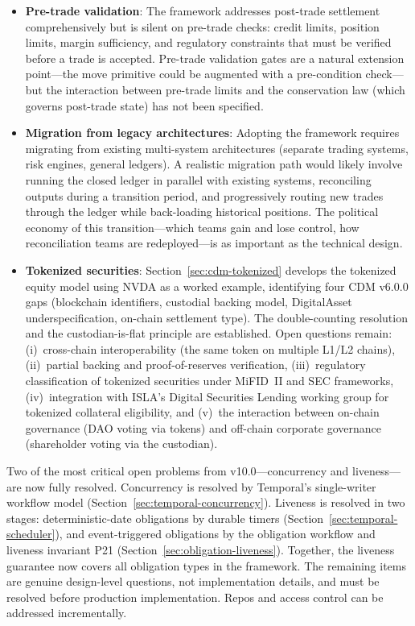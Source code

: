 \documentclass[11pt,a4paper]{article}
\begin{document}
\begin{itemize}
\item \textbf{Pre-trade validation}: The framework addresses post-trade settlement comprehensively but is silent on pre-trade checks: credit limits, position limits, margin sufficiency, and regulatory constraints that must be verified before a trade is accepted. Pre-trade validation gates are a natural extension point---the move primitive could be augmented with a pre-condition check---but the interaction between pre-trade limits and the conservation law (which governs post-trade state) has not been specified.

\item \textbf{Migration from legacy architectures}: Adopting the framework requires migrating from existing multi-system architectures (separate trading systems, risk engines, general ledgers). A realistic migration path would likely involve running the closed ledger in parallel with existing systems, reconciling outputs during a transition period, and progressively routing new trades through the ledger while back-loading historical positions. The political economy of this transition---which teams gain and lose control, how reconciliation teams are redeployed---is as important as the technical design.

\item \textbf{Tokenized securities}: Section~\ref{sec:cdm-tokenized} develops the tokenized equity model using NVDA as a worked example, identifying four CDM v6.0.0 gaps (blockchain identifiers, custodial backing model, DigitalAsset underspecification, on-chain settlement type). The double-counting resolution and the custodian-is-flat principle are established. Open questions remain: (i)~cross-chain interoperability (the same token on multiple L1/L2 chains), (ii)~partial backing and proof-of-reserves verification, (iii)~regulatory classification of tokenized securities under MiFID~II and SEC frameworks, (iv)~integration with ISLA's Digital Securities Lending working group for tokenized collateral eligibility, and (v)~the interaction between on-chain governance (DAO voting via tokens) and off-chain corporate governance (shareholder voting via the custodian).
\end{itemize}

\noindent Two of the most critical open problems from v10.0---concurrency and liveness---are now fully resolved. Concurrency is resolved by Temporal's single-writer workflow model (Section~\ref{sec:temporal-concurrency}). Liveness is resolved in two stages: deterministic-date obligations by durable timers (Section~\ref{sec:temporal-scheduler}), and event-triggered obligations by the obligation workflow and liveness invariant P21 (Section~\ref{sec:obligation-liveness}). Together, the liveness guarantee now covers all obligation types in the framework. The remaining items are genuine design-level questions, not implementation details, and must be resolved before production implementation. Repos and access control can be addressed incrementally.
\end{document}
